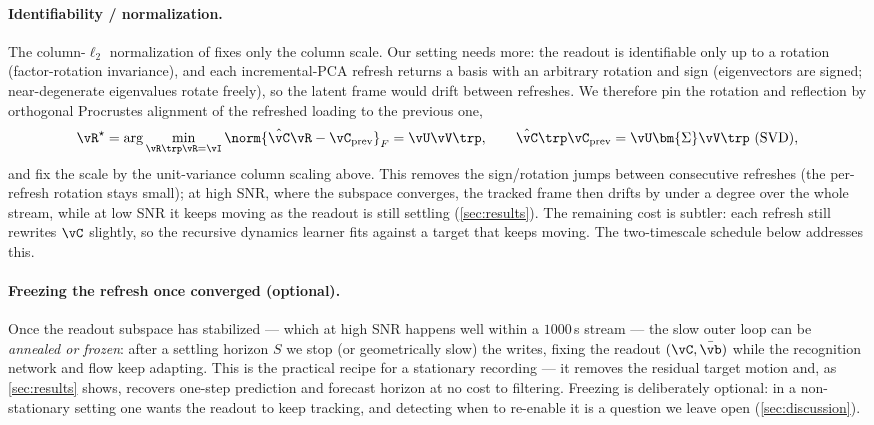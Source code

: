 \documentclass[11pt]{article}
\newcommand{\vSig}{\bm{\Sigma}}
\begin{document}
\paragraph{Identifiability / normalization.}
The column-$\ell_2$ normalization of \autocite{zhao2020variational} fixes only the column scale.
Our setting needs more: the readout is identifiable only up to a rotation (factor-rotation
invariance), and each incremental-PCA refresh returns a basis with an arbitrary rotation and sign
(eigenvectors are signed; near-degenerate eigenvalues rotate freely), so the latent frame would
drift between refreshes. We therefore pin the rotation and reflection by orthogonal Procrustes
alignment of the refreshed loading to the previous one,
\begin{equation}
  \vR^\star=\arg\min_{\vR\trp\vR=\vI}\norm{\hat\vC\vR-\vC_{\mathrm{prev}}}_F=\vU\vV\trp,\qquad
  \hat\vC\trp\vC_{\mathrm{prev}}=\vU\vSig\vV\trp\ (\text{SVD}), \label{eq:procrustes}
\end{equation}
and fix the scale by the unit-variance column scaling above. This removes the sign/rotation jumps
between consecutive refreshes (the per-refresh rotation stays small); at high SNR, where the
subspace converges, the tracked frame then drifts by under a degree over the whole stream, while at
low SNR it keeps moving as the readout is still settling (\cref{sec:results}). The remaining cost
is subtler: each refresh still rewrites $\vC$ slightly, so the recursive dynamics learner fits
against a target that keeps moving. The two-timescale schedule below addresses this.

\paragraph{Freezing the refresh once converged (optional).}
Once the readout subspace has stabilized --- which at high SNR happens well within a $1000$\,s
stream --- the slow outer loop can be \emph{annealed or frozen}: after a settling horizon $S$ we stop (or
geometrically slow) the writes, fixing the readout $(\vC,\bar\vb)$ while the recognition network and flow keep
adapting. This is the practical recipe for a stationary recording --- it removes the residual
target motion and, as \cref{sec:results} shows, recovers one-step prediction and forecast horizon
at no cost to filtering. Freezing is deliberately optional: in a non-stationary setting one wants
the readout to keep tracking, and detecting when to re-enable it is a question we leave open
(\cref{sec:discussion}).
\end{document}
